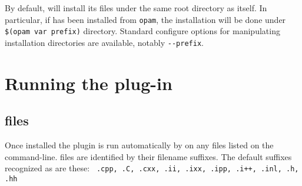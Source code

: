 By default, \fclang will install its files under the same root
directory as \framac itself. In particular, if \framac has been
installed from \lstinline|opam|, the installation will be done under
\verb|$(opam var prefix)| directory. Standard configure options for
manipulating installation directories are available, notably
\verb|--prefix|.

%
%
%
%
%
%
%
%
%

\chapter{Running the plug-in}

\section{\cpp files}
Once installed the plugin is run automatically by \framac on any \cpp files listed on the command-line. \cpp files are identified by their filename suffixes. The default suffixes recognized as \cpp are these:
\lstinline| .cpp, .C, .cxx, .ii, .ixx, .ipp, .i++, .inl, .h, .hh|

